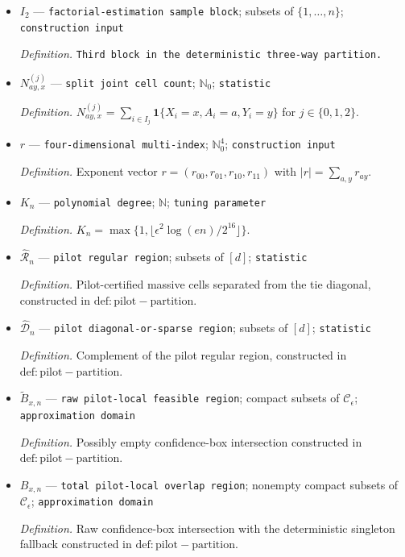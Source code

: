 \documentclass{article}
\begin{document}
\begin{itemize}
  \item \(I_2\) --- \texttt{factorial-\allowbreak{}estimation sample block}; subsets of \(\{1,\ldots,n\}\); \texttt{construction input}
  \par\smallskip\noindent\emph{Definition.} \texttt{Third block in the deterministic three-\allowbreak{}way partition.}
  \item \(N^{(j)}_{ay,x}\) --- \texttt{split joint cell count}; \(\mathbb N_0\); \texttt{statistic}
  \par\smallskip\noindent\emph{Definition.} \(N^{(j)}_{ay,x}=\sum_{i\in I_j}\mathbf 1\{X_i=x,A_i=a,Y_i=y\}\) for \(j\in\{0,1,2\}\).
  \item \(r\) --- \texttt{four-\allowbreak{}dimensional multi-\allowbreak{}index}; \(\mathbb N_0^4\); \texttt{construction input}
  \par\smallskip\noindent\emph{Definition.} Exponent vector \(r=(r_{00},r_{01},r_{10},r_{11})\) with \(\lvert r\rvert=\sum_{a,y}r_{ay}\).
  \item \(K_n\) --- \texttt{polynomial degree}; \(\mathbb N\); \texttt{tuning parameter}
  \par\smallskip\noindent\emph{Definition.} \(K_n=\max\{1,\lfloor\epsilon^2\log(en)/2^{16}\rfloor\}\).
  \item \(\widehat{\mathcal R}_n\) --- \texttt{pilot regular region}; subsets of \([d]\); \texttt{statistic}
  \par\smallskip\noindent\emph{Definition.} Pilot-certified massive cells separated from the tie diagonal, constructed in \(\mathrm{def:pilot-partition}\).
  \item \(\widehat{\mathcal D}_n\) --- \texttt{pilot diagonal-\allowbreak{}or-\allowbreak{}sparse region}; subsets of \([d]\); \texttt{statistic}
  \par\smallskip\noindent\emph{Definition.} Complement of the pilot regular region, constructed in \(\mathrm{def:pilot-partition}\).
  \item \(\widetilde B_{x,n}\) --- \texttt{raw pilot-\allowbreak{}local feasible region}; compact subsets of \(\mathcal C_\epsilon\); \texttt{approximation domain}
  \par\smallskip\noindent\emph{Definition.} Possibly empty confidence-box intersection constructed in \(\mathrm{def:pilot-partition}\).
  \item \(B_{x,n}\) --- \texttt{total pilot-\allowbreak{}local overlap region}; nonempty compact subsets of \(\mathcal C_\epsilon\); \texttt{approximation domain}
  \par\smallskip\noindent\emph{Definition.} Raw confidence-box intersection with the deterministic singleton fallback constructed in \(\mathrm{def:pilot-partition}\).

\end{itemize}
\end{document}
